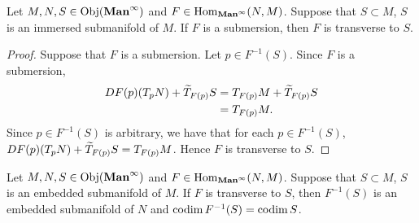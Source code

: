 \documentclass{book}
\begin{document}
	\begin{ex} 
		Let $M, N, S \in \operatorname{Obj}(\operatorname*{\text{\textbf{Man}}^{\infty}})$ and $F \in \operatorname{Hom}_{\operatorname*{\text{\textbf{Man}}^{\infty}}}(N, M)$. Suppose that $S \subset M$, $S$ is an immersed submanifold of $M$. If $F$ is a submersion, then $F$ is transverse to $S$.  
	\end{ex}

	\begin{proof}
		Suppose that $F$ is a submersion. Let $p \in F^{-1}(S)$. Since $F$ is a submersion, 
		\begin{align*}
			DF(p)(T_pN) + \widetilde{T}_{F(p)}S
			& = T_{F(p)}M + \widetilde{T}_{F(p)}S \\
			& = T_{F(p)}M. 
		\end{align*} 
		Since $p \in F^{-1}(S)$ is arbitrary, we have that for each $p \in F^{-1}(S)$, $DF(p)(T_pN) + \widetilde{T}_{F(p)}S = T_{F(p)}M$. Hence $F$ is transverse to $S$.
	\end{proof}

	\begin{ex} 
		Let $M, N, S \in \operatorname{Obj}(\operatorname*{\text{\textbf{Man}}^{\infty}})$ and $F \in \operatorname{Hom}_{\operatorname*{\text{\textbf{Man}}^{\infty}}}(N, M)$. Suppose that $S \subset M$, $S$ is an embedded submanifold of $M$. If $F$ is transverse to $S$, then $F^{-1}(S)$ is an embedded submanifold of $N$ and $\operatorname{codim} F^{-1}(S) = \operatorname{codim} S$. \\
	\end{ex}
\end{document}
